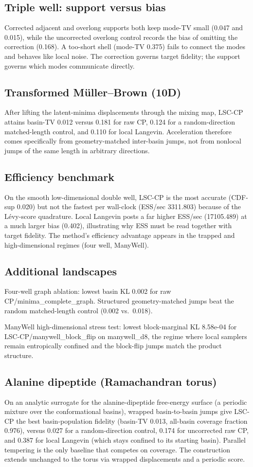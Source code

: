 \subsection{Triple well: support versus bias}Corrected adjacent and overlong supports both keep mode-TV small (0.047 and 0.015), while the uncorrected overlong control records the bias of omitting the correction (0.168). A too-short shell (mode-TV 0.375) fails to connect the modes and behaves like local noise. The correction governs target fidelity; the support governs which modes communicate directly.

\subsection{Transformed M\"uller--Brown (10D)}After lifting the latent-minima displacements through the mixing map, LSC-CP attains basin-TV 0.012 versus 0.181 for raw CP, 0.124 for a random-direction matched-length control, and 0.110 for local Langevin. Acceleration therefore comes specifically from geometry-matched inter-basin jumps, not from nonlocal jumps of the same length in arbitrary directions.

\subsection{Efficiency benchmark}On the smooth low-dimensional double well, LSC-CP is the most accurate (CDF-sup 0.020) but not the fastest per wall-clock (ESS/sec 3311.803) because of the L\'evy-score quadrature. Local Langevin posts a far higher ESS/sec (17105.489) at a much larger bias (0.402), illustrating why ESS must be read together with target fidelity. The method's efficiency advantage appears in the trapped and high-dimensional regimes (four well, ManyWell).

\subsection{Additional landscapes}Four-well graph ablation: lowest basin KL 0.002 for raw CP/minima\_complete\_graph. Structured geometry-matched jumps beat the random matched-length control (0.002 vs.\ 0.018).

ManyWell high-dimensional stress test: lowest block-marginal KL 8.58e-04 for LSC-CP/manywell\_block\_flip on manywell\_d8, the regime where local samplers remain entropically confined and the block-flip jumps match the product structure.

\subsection{Alanine dipeptide (Ramachandran torus)}On an analytic surrogate for the alanine-dipeptide free-energy surface (a periodic mixture over the conformational basins), wrapped basin-to-basin jumps give LSC-CP the best basin-population fidelity (basin-TV 0.013, all-basin coverage fraction 0.976), versus 0.027 for a random-direction control, 0.174 for uncorrected raw CP, and 0.387 for local Langevin (which stays confined to its starting basin). Parallel tempering is the only baseline that competes on coverage. The construction extends unchanged to the torus via wrapped displacements and a periodic score.

